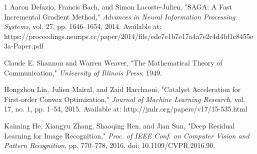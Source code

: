 \documentclass{article}
\begin{document}
\begin{thebibliography}{1}
 Aaron Defazio, Francis Bach, and Simon Lacoste-Julien, "SAGA: A Fast Incremental Gradient Method," \textit{Advances in Neural Information Processing Systems}, vol. 27, pp. 1646--1654, 2014. Available at: https://proceedings.neurips.cc/paper/2014/file/ede7e1b7e17a4a7e2c4d4bf1c8455e3a-Paper.pdf

 Claude E. Shannon and Warren Weaver, "The Mathematical Theory of Communication," \textit{University of Illinois Press}, 1949.

 Hongzhou Lin, Julien Mairal, and Zaid Harchaoui, "Catalyst Acceleration for First-order Convex Optimization," \textit{Journal of Machine Learning Research}, vol. 17, no. 1, pp. 1--54, 2015. Available at: http://jmlr.org/papers/v17/15-535.html

 Kaiming He, Xiangyu Zhang, Shaoqing Ren, and Jian Sun, "Deep Residual Learning for Image Recognition," \textit{Proc. of IEEE Conf. on Computer Vision and Pattern Recognition}, pp. 770--778, 2016. doi: 10.1109/CVPR.2016.90.





\end{thebibliography}
\end{document}
